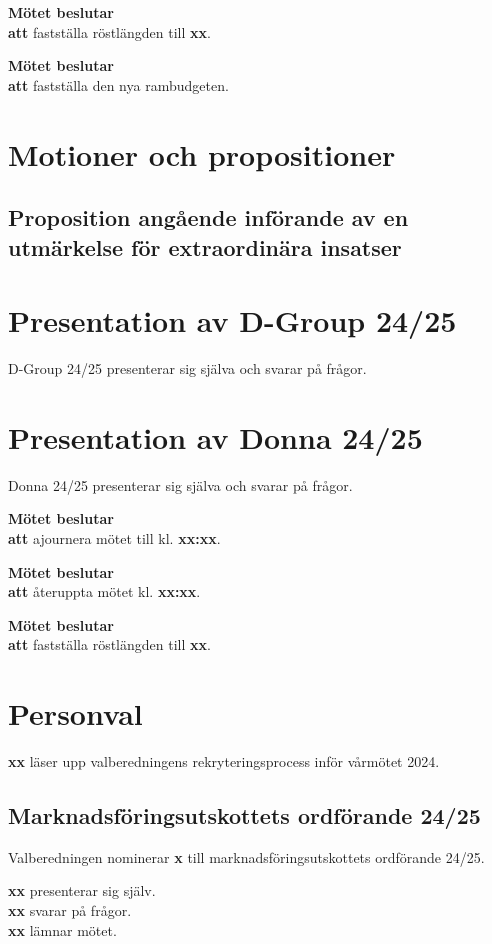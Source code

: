 \documentclass{datateknologsektionen-document}
\newcommand{\ind}{\hspace*{2em}}
\newcommand{\motetbeslutar}{\textbf{Mötet beslutar}}
\newcommand{\att}{\\\ind\textbf{att}}
\newcommand{\rostlangd}[1]{\motetbeslutar\att{} fastställa röstlängden till \textbf{#1}.}
\begin{document}
\rostlangd{xx}

\motetbeslutar\att{} fastställa den nya rambudgeten.


\section{Motioner och propositioner}

\subsection{Proposition angående införande av en utmärkelse för
extraordinära insatser}


\section{Presentation av D-Group 24/25}

D-Group 24/25 presenterar sig själva och svarar på frågor.

\section{Presentation av Donna 24/25}

Donna 24/25 presenterar sig själva och svarar på frågor.

\motetbeslutar\att{} ajournera mötet till kl. \textbf{xx:xx}.

\motetbeslutar\att{} återuppta mötet kl. \textbf{xx:xx}.

\rostlangd{xx}

\pagebreak
\section{Personval}

\textbf{xx} läser upp valberedningens rekryteringsprocess inför vårmötet 2024.

\subsection{Marknadsföringsutskottets ordförande 24/25}

Valberedningen nominerar \textbf{x} till marknadsföringsutskottets ordförande 24/25.

\textbf{xx} presenterar sig själv.\\
\textbf{xx} svarar på frågor.\\
\textbf{xx} lämnar mötet.
\end{document}
